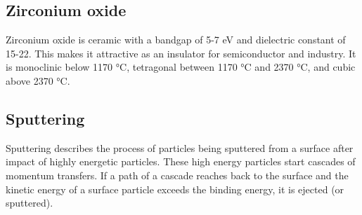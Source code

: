 \subsection{Zirconium oxide}
Zirconium oxide  is ceramic with a bandgap of 5-7 eV and dielectric constant of 15-22\cite{Anwar2017}. 
This makes it attractive as an insulator for semiconductor and  industry. 
It is monoclinic below 1170 °C, tetragonal between 1170 °C and 2370 °C, and cubic above 2370 °C\cite{Stevens1986}.

\subsection{Sputtering}
Sputtering describes the process of particles being sputtered from a surface after 
impact of highly energetic particles.
These high energy particles start cascades of momentum transfers. 
If a path of a cascade reaches back to the surface and the kinetic energy of a surface 
particle exceeds the binding energy, it is ejected (or sputtered).

